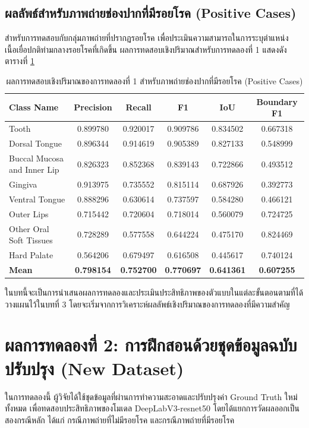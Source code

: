 \subsection{ผลลัพธ์สำหรับภาพถ่ายช่องปากที่มีรอยโรค (Positive Cases)}
สำหรับการทดสอบกับกลุ่มภาพถ่ายที่ปรากฏรอยโรค เพื่อประเมินความสามารถในการระบุตำแหน่งเนื้อเยื่อปกติท่ามกลางรอยโรคที่เกิดขึ้น ผลการทดสอบเชิงปริมาณสำหรับการทดลองที่ 1 แสดงดังตารางที่ \ref{tab:eval_baseline_old_dataset_positive}

\begin{table}[H]
\centering
\caption{ผลการทดสอบเชิงปริมาณของการทดลองที่ 1 สำหรับภาพถ่ายช่องปากที่มีรอยโรค (Positive Cases)}
\label{tab:eval_baseline_old_dataset_positive}
\begin{tabular}{|l|c|c|c|c|c|}
\hline
\textbf{Class Name} & \textbf{Precision} & \textbf{Recall} & \textbf{F1} & \textbf{IoU} & \textbf{Boundary F1} \\ \hline
Tooth & 0.899780 & 0.920017 & 0.909786 & 0.834502 & 0.667318 \\
Dorsal Tongue & 0.896344 & 0.914619 & 0.905389 & 0.827133 & 0.548999 \\
Buccal Mucosa and Inner Lip & 0.826323 & 0.852368 & 0.839143 & 0.722866 & 0.493512 \\
Gingiva & 0.913975 & 0.735552 & 0.815114 & 0.687926 & 0.392773 \\
Ventral Tongue & 0.888296 & 0.630614 & 0.737597 & 0.584280 & 0.466121 \\
Outer Lips & 0.715442 & 0.720604 & 0.718014 & 0.560079 & 0.724725 \\
Other Oral Soft Tissues & 0.728289 & 0.577558 & 0.644224 & 0.475170 & 0.824469 \\
Hard Palate & 0.564206 & 0.679497 & 0.616508 & 0.445617 & 0.740124 \\ \hline
\textbf{Mean} & \textbf{0.798154} & \textbf{0.752700} & \textbf{0.770697} & \textbf{0.641361} & \textbf{0.607255} \\ \hline
\end{tabular}
\end{table}

ในบทนี้จะเป็นการนำเสนอผลการทดลองและประเมินประสิทธิภาพของตัวแบบในแต่ละขั้นตอนตามที่ได้วางแผนไว้ในบทที่ 3 โดยจะเริ่มจากการวิเคราะห์ผลลัพธ์เชิงปริมาณของการทดลองที่มีความสำคัญ

\section{ผลการทดลองที่ 2: การฝึกสอนด้วยชุดข้อมูลฉบับปรับปรุง (New Dataset)}
ในการทดลองนี้ ผู้วิจัยได้ใช้ชุดข้อมูลที่ผ่านการทำความสะอาดและปรับปรุงค่า Ground Truth ใหม่ทั้งหมด เพื่อทดสอบประสิทธิภาพของโมเดล DeepLabV3-resnet50 โดยได้แยกการวัดผลออกเป็นสองกรณีหลัก ได้แก่ กรณีภาพถ่ายที่ไม่มีรอยโรค และกรณีภาพถ่ายที่มีรอยโรค

